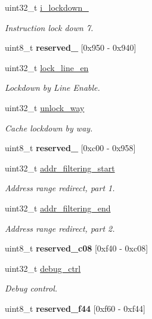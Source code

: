 \begin{DoxyCompactItemize}
uint32\+\_\+t \mbox{\hyperlink{group__L2C-310__cache_ga025f5cca646d59500247965456ede2c9}{i\+\_\+lockdown\+\_}}
\begin{DoxyCompactList}\small\item\em Instruction lock down 7. \end{DoxyCompactList}\item 
uint8\+\_\+t {\bfseries reserved\+\_} \mbox{[}0x950 -\/ 0x940\mbox{]}
\item 
uint32\+\_\+t \mbox{\hyperlink{group__L2C-310__cache_gadbfb555b4972509b0ab3787aebf3cf23}{lock\+\_\+line\+\_\+en}}
\begin{DoxyCompactList}\small\item\em Lockdown by Line Enable. \end{DoxyCompactList}\item 
uint32\+\_\+t \mbox{\hyperlink{group__L2C-310__cache_ga29c892e3731778a520ce963d37cb4da2}{unlock\+\_\+way}}
\begin{DoxyCompactList}\small\item\em Cache lockdown by way. \end{DoxyCompactList}\item 
uint8\+\_\+t {\bfseries reserved\+\_} \mbox{[}0xc00 -\/ 0x958\mbox{]}
\item 
uint32\+\_\+t \mbox{\hyperlink{group__L2C-310__cache_ga062a4d913b2698c58ece4bd4b60b30aa}{addr\+\_\+filtering\+\_\+start}}
\begin{DoxyCompactList}\small\item\em Address range redirect, part 1. \end{DoxyCompactList}\item 
uint32\+\_\+t \mbox{\hyperlink{group__L2C-310__cache_ga6d7fc48f292c09b992efaa61ec49cc4a}{addr\+\_\+filtering\+\_\+end}}
\begin{DoxyCompactList}\small\item\em Address range redirect, part 2. \end{DoxyCompactList}\item 
uint8\+\_\+t {\bfseries reserved\+\_\+c08} \mbox{[}0xf40 -\/ 0xc08\mbox{]}
\item 
uint32\+\_\+t \mbox{\hyperlink{group__L2C-310__cache_gafb06e31ba83abe243926605bb13ddff0}{debug\+\_\+ctrl}}
\begin{DoxyCompactList}\small\item\em Debug control. \end{DoxyCompactList}\item 
uint8\+\_\+t {\bfseries reserved\+\_\+f44} \mbox{[}0xf60 -\/ 0xf44\mbox{]}

\end{DoxyCompactItemize}
